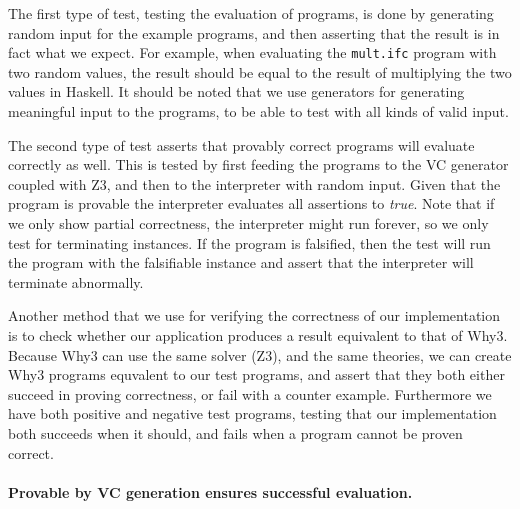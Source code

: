 The first type of test, testing the evaluation of programs, is done by generating random input for the example programs, and then asserting that the result is in fact what we expect.
For example, when evaluating the \texttt{mult.ifc} program with two random values, the result should be equal to the result of multiplying the two values in Haskell.
It should be noted that we use generators for generating meaningful input to the programs, to be able to test with all kinds of valid input.

The second type of test asserts that provably correct programs will evaluate correctly as well.
This is tested by first feeding the programs to the VC generator coupled with Z3, and then to the interpreter with random input.
Given that the program is provable the interpreter evaluates all assertions to \textit{true}.
Note that if we only show partial correctness, the interpreter might run forever, so we only test for terminating instances.
If the program is falsified, then the test will run the program with the falsifiable instance and assert that the interpreter will terminate abnormally.

Another method that we use for verifying the correctness of our implementation is to check whether our application produces a result equivalent to that of Why3.
Because Why3 can use the same solver (Z3), and the same theories, we can create Why3 programs equvalent to our test programs, and assert that they both either succeed in proving correctness, or fail with a counter example.
Furthermore we have both positive and negative test programs, testing that our implementation both succeeds when it should, and fails when a program cannot be proven correct.

\paragraph{Provable by VC generation ensures successful evaluation.}

